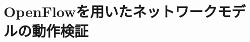 \chapter{OpenFlowを用いたネットワークモデルの動作検証}

\begin{comment}
　本研究では，シミュレーションによってns-3上でEUNETを構築し，シミュレーションを行うことを目的としている．
シミュレーションは，実際のEUNETをモデル化して構築した上でパケットをキャプチャする事で性能を評価する事ができるようになる．

本章では，EUNETを再現するために作成したモジュールをどのように利用してトポロジを構築し，動作確認を行ったか解説する．\\

\section{各モジュールの動作確認}

本研究では3章で説明したようにns-3上でモジュールをC++で記述する事により作成しており，そのモジュールの組み合わせで意図するネットワークを構築していく．
そのため前提条件として，各モジュールが正常に動作する事が求められる．
そこで，作成したモジュールを用いて単純なネットワークを構成し，そのネットワークでのパケットの振る舞いを検証する事でモジュールが正常に動作しているかを確認した．\\
その際使用したテストコードを解説し，その結果を示す．実際に使用したテストコードは付録参照．

\subsection{EunetTestにおけるテストシナリオ}

動作確認を行うネットワーク機器は端末，L2スイッチ，L3スイッチの3つである．この機器を用いてネットワークを構成する．
端末はUDPで通信をおこなっており，パケットロスが生じた場合は再送を行わない．

\begin{figure}[tb]
\begin{center}
\scalebox{0.6}{\texttt{[image: testsuit構成図.eps]}} 
\caption{テストシナリオ構成}
\label{テストシナリオ構成}
\end{center}
\end{figure}

テストにおける構成は，図\ref{テストシナリオ構成}に記述している．
L3スイッチは3つ作成する．各L3スイッチはr1，r2，r3という名前を付け全てのL3スイッチは隣接して接続されている．
テストケースではr1，r3は以下に複数のL2スイッチ，端末を持つ．これを二つのエリアとみなし，ルーチングを行うことが可能か確認を行う．


\end{comment}
